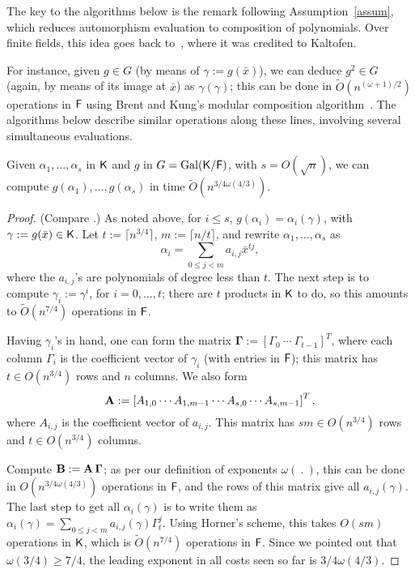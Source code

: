 The key to the algorithms below is the remark following
Assumption~\ref{assum}, which reduces automorphism evaluation to
composition of polynomials.  Over finite fields, this idea goes back
to~, where it was credited to Kaltofen.

For instance, given $g \in G$ (by means of $\gamma:=g(\bar x)$), we can
deduce $g^2 \in G$ (again, by means of its image at $\bar x$) as
$\gamma(\gamma)$; this can be done in $\tilde{O}(n^{(\omega+1)/2})$
operations in ${\mathsf{F}}$ using Brent and Kung's modular composition
algorithm~\cite{BrKu78}. The algorithms below describe similar operations 
along these lines, involving several simultaneous evaluations.

\begin{lemma}\label{lem:modcom}
  Given $\alpha_1,\dots,\alpha_s$ in ${\mathsf{K}}$ and $g$ in $G =
  \mathrm{Gal}({\mathsf{K}}/{\mathsf{F}})$, with $s = O(\sqrt{n})$, we can compute
  $g(\alpha_1),\dots,g(\alpha_s)$ in time $\tilde
  O(n^{{3}/{4}\omega({4}/{3})})$.
\end{lemma}
\begin{proof}
(Compare \cite[Lemma~3]{KalSho98}.) As noted above, for $i\le s$,
  $g(\alpha_i) = \alpha_i(\gamma)$, with $\gamma := g(\bar x) \in {\mathsf{K}}$.
  Let $t := \lceil n^{3/4} \rceil$, $m:=\lceil n/t\rceil$, and rewrite $\alpha_1 , \ldots , \alpha_s$ as 
$$\alpha_i = \sum_{0 \leq j < m} a_{i,j}\bar x^{tj},$$ where the
  $a_{i,j}$'s are polynomials of degree less than $t$. The next step
  is to compute $\gamma_i := \gamma^i$, for $i = 0 , \ldots , t$;
  there are $t$ products in ${\mathsf{K}}$ to do, so this amounts to
  $\tilde{O}(n^{7/4})$ operations in ${\mathsf{F}}$.

  Having $\gamma_i$'s in hand, one can form the matrix
  $\boldsymbol{\Gamma} := \left[ \Gamma_0 ~ \cdots ~ \Gamma_{t-1}
    \right]^T$, where each column $\Gamma_i$ is the coefficient vector
  of $\gamma_i$ (with entries in ${\mathsf{F}}$); this matrix has $t \in
  O(n^{3/4})$ rows and $n$ columns. We also form
  $$\mat A := \left[{A}_{1,0} \cdots {A}_{1,m-1} \cdots
    {A}_{s,0} \cdots {A}_{s,m-1}\right]^T,$$ where
  ${A}_{i,j}$ is the coefficient vector of $a_{i,j}$. This matrix 
  has $s m \in O(n^{3/4})$ rows and $t \in O(n^{3/4})$ columns.

  Compute $\mat B:=\mat A\, \boldsymbol{\Gamma}$; as per our
  definition of exponents $\omega(\ .\ )$, this can be done in
  $O(n^{3/4 \omega(4/3)})$ operations in ${\mathsf{F}}$, and the rows of this matrix
  give all $a_{i,j}(\gamma)$.  The last step to get all
  $\alpha_i(\gamma)$ is to write them as $\alpha_i(\gamma) = \sum_{0
    \leq j < m} a_{i,j}(\gamma) \Gamma_t^{j}.$ Using Horner's scheme,
  this takes $O(sm)$ operations in ${\mathsf{K}}$, which is $\tilde{O}(n^{7/4})$
  operations in ${\mathsf{F}}$. Since we pointed out that $\omega(3/4) \ge 7/4$,
  the leading exponent in all costs seen so far is
  ${3}/{4}\omega({4}/{3})$.
\end{proof}

